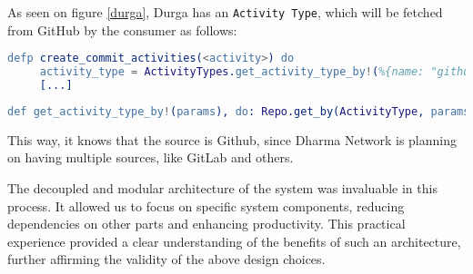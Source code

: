 As seen on figure \ref{durga}, Durga has an \texttt{Activity Type}, which will be fetched from GitHub by the consumer as follows:

\begin{lstlisting}[language=erlang, caption={Create Activity Type on activity\_consumer.ex}]
   defp create_commit_activities(<activity>) do
     activity_type = ActivityTypes.get_activity_type_by!(%{name: "github", description: "<description>"})
     [...]
\end{lstlisting}

\begin{lstlisting}[language=erlang, caption={Get Activity Type on activity\_types.ex}]
def get_activity_type_by!(params), do: Repo.get_by(ActivityType, params)
\end{lstlisting}

This way, it knows that the source is Github, since Dharma Network is planning on having multiple sources, like GitLab and others.\newline

The decoupled and modular architecture of the system was invaluable in this process. It allowed us to focus on specific system components, reducing dependencies on other parts and enhancing productivity. This practical experience provided a clear understanding of the benefits of such an architecture, further affirming the validity of the above design choices.\newline




 



